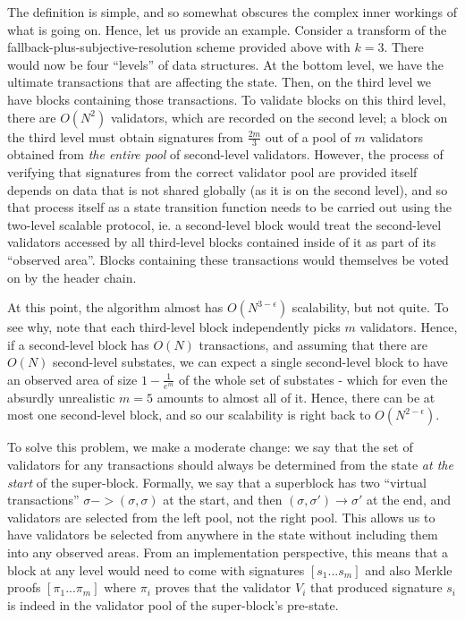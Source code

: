 \documentclass[11pt,a4paper]{report}
\theoremstyle{plain}
\theoremstyle{definition}
\theoremstyle{remark}
\begin{document}
The definition is simple, and so somewhat obscures the complex inner workings of what is going on. Hence, let us provide an example. Consider a transform of the fallback-plus-subjective-resolution scheme provided above with $k = 3$. There would now be four ``levels'' of data structures. At the bottom level, we have the ultimate transactions that are affecting the state. Then, on the third level we have blocks containing those transactions. To validate blocks on this third level, there are $O(N^2)$ validators, which are recorded on the second level; a block on the third level must obtain signatures from $\frac{2m}{3}$ out of a pool of $m$ validators obtained from \emph{the entire pool} of second-level validators. However, the process of verifying that signatures from the correct validator pool are provided itself depends on data that is not shared globally (as it is on the second level), and so that process itself as a state transition function needs to be carried out using the two-level scalable protocol, ie. a second-level block would treat the second-level validators accessed by all third-level blocks contained inside of it as part of its ``observed area''. Blocks containing these transactions would themselves be voted on by the header chain.

At this point, the algorithm almost has $O(N^{3-\epsilon})$ scalability, but not quite. To see why, note that each third-level block independently picks $m$ validators. Hence, if a second-level block has $O(N)$ transactions, and assuming that there are $O(N)$ second-level substates, we can expect a single second-level block to have an observed area of size $1 - \frac{1}{e^m}$ of the whole set of substates - which for even the absurdly unrealistic $m = 5$ amounts to almost all of it. Hence, there can be at most one second-level block, and so our scalability is right back to $O(N^{2-\epsilon})$.

To solve this problem, we make a moderate change: we say that the set of validators for any transactions should always be determined from the state \emph{at the start} of the super-block. Formally, we say that a superblock has two ``virtual transactions'' $\sigma -> (\sigma, \sigma)$ at the start, and then $(\sigma, \sigma') \rightarrow \sigma'$ at the end, and validators are selected from the left pool, not the right pool. This allows us to have validators be selected from anywhere in the state without including them into any observed areas. From an implementation perspective, this means that a block at any level would need to come with signatures $[s_1 ... s_m]$ and also Merkle proofs $[\pi_1 ... \pi_m]$ where $\pi_i$ proves that the validator $V_i$ that produced signature $s_i$ is indeed in the validator pool of the super-block's pre-state.
\end{document}
